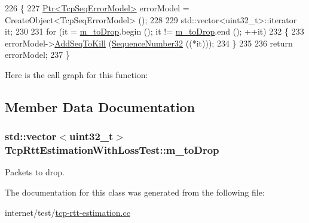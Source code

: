 \begin{DoxyCode}
226 \{
227   \hyperlink{classns3_1_1Ptr}{Ptr<TcpSeqErrorModel>} errorModel = CreateObject<TcpSeqErrorModel> ();
228 
229   std::vector<uint32\_t>::iterator it;
230 
231   \textcolor{keywordflow}{for} (it = \hyperlink{classTcpRttEstimationWithLossTest_ad7a7eff0d4e1e9a2c4a6f3375a5effc4}{m\_toDrop}.begin (); it != \hyperlink{classTcpRttEstimationWithLossTest_ad7a7eff0d4e1e9a2c4a6f3375a5effc4}{m\_toDrop}.end (); ++it)
232     \{
233       errorModel->\hyperlink{classns3_1_1TcpSeqErrorModel_a5c414ce6277ae9ff84decb83a0847386}{AddSeqToKill} (\hyperlink{classns3_1_1SequenceNumber}{SequenceNumber32} ((*it)));
234     \}
235 
236   \textcolor{keywordflow}{return} errorModel;
237 \}
\end{DoxyCode}


Here is the call graph for this function\+:




\subsection{Member Data Documentation}
\subsubsection[{\texorpdfstring{m\+\_\+to\+Drop}{m_toDrop}}]{\setlength{\rightskip}{0pt plus 5cm}std\+::vector$<$uint32\+\_\+t$>$ Tcp\+Rtt\+Estimation\+With\+Loss\+Test\+::m\+\_\+to\+Drop\hspace{0.3cm}{\ttfamily [private]}}\hypertarget{classTcpRttEstimationWithLossTest_ad7a7eff0d4e1e9a2c4a6f3375a5effc4}{}\label{classTcpRttEstimationWithLossTest_ad7a7eff0d4e1e9a2c4a6f3375a5effc4}


Packets to drop. 



The documentation for this class was generated from the following file\+:\begin{DoxyCompactItemize}
\item 
internet/test/\hyperlink{tcp-rtt-estimation_8cc}{tcp-\/rtt-\/estimation.\+cc}\end{DoxyCompactItemize}
